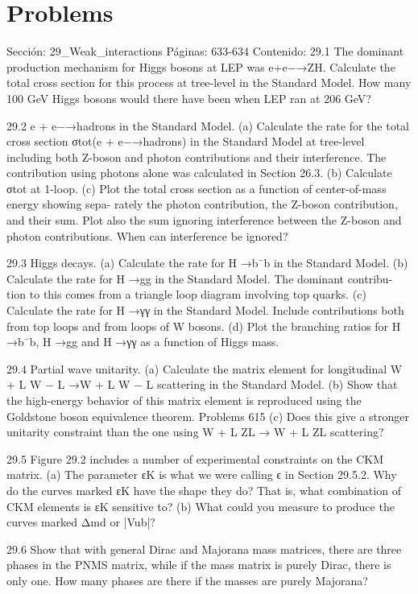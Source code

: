 \section*{Problems}
Sección: 29_Weak_interactions
Páginas: 633-634
Contenido:
29.1 The dominant production mechanism for Higgs bosons at LEP was e+e−→ZH.
Calculate the total cross section for this process at tree-level in the Standard Model.
How many 100 GeV Higgs bosons would there have been when LEP ran at
206 GeV?

29.2 e + e−→hadrons in the Standard Model.
(a) Calculate the rate for the total cross section σtot(e + e−→hadrons) in the
Standard Model at tree-level including both Z-boson and photon contributions
and their interference. The contribution using photons alone was calculated in
Section 26.3.
(b) Calculate σtot at 1-loop.
(c) Plot the total cross section as a function of center-of-mass energy showing sepa-
rately the photon contribution, the Z-boson contribution, and their sum. Plot also
the sum ignoring interference between the Z-boson and photon contributions.
When can interference be ignored?

29.3 Higgs decays.
(a) Calculate the rate for H →b¯b in the Standard Model.
(b) Calculate the rate for H →gg in the Standard Model. The dominant contribu-
tion to this comes from a triangle loop diagram involving top quarks.
(c) Calculate the rate for H →γγ in the Standard Model. Include contributions
both from top loops and from loops of W bosons.
(d) Plot the branching ratios for H →b¯b, H →gg and H →γγ as a function of
Higgs mass.

29.4 Partial wave unitarity.
(a) Calculate the matrix element for longitudinal W +
L W −
L →W +
L W −
L scattering in
the Standard Model.
(b) Show that the high-energy behavior of this matrix element is reproduced using
the Goldstone boson equivalence theorem.
Problems
615
(c) Does this give a stronger unitarity constraint than the one using W +
L ZL →
W +
L ZL scattering?

29.5 Figure 29.2 includes a number of experimental constraints on the CKM matrix.
(a) The parameter εK is what we were calling ϵ in Section 29.5.2. Why do the
curves marked εK have the shape they do? That is, what combination of CKM
elements is εK sensitive to?
(b) What could you measure to produce the curves marked Δmd or |Vub|?

29.6 Show that with general Dirac and Majorana mass matrices, there are three phases in
the PNMS matrix, while if the mass matrix is purely Dirac, there is only one. How
many phases are there if the masses are purely Majorana?

